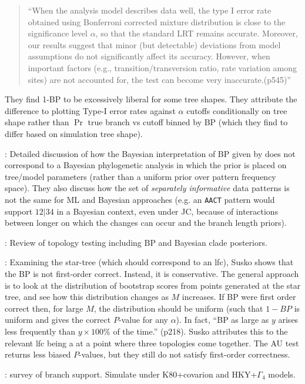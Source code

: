 \documentclass[11pt]{article}
\newcommand{\pvalue}{$P$-value\xspace}
\newcommand{\pvalues}{$P$-values\xspace}
\begin{document}
\begin{quote}
	``When the analysis model describes data well, the type I error rate obtained using Bonferroni corrected mixture distribution is close to the significance level $\alpha$, so that the standard LRT remains accurate. Moreover, our results suggest that minor (but detectable) deviations from model assumptions do not significantly affect its accuracy. However, when important factors (e.g., transition/transversion ratio, rate variation among sites) are not accounted for, the test can become very inaccurate.(p545)''
\end{quote}

They find 1-BP to be excessively liberal for some tree shapes. They attribute the difference to plotting Type-I error rates against $\alpha$ cutoffs conditionally on tree shape rather than $\Pr$ true branch vs cutoff binned by BP (which they find to differ based on simulation tree shape).

\citet{SvennbladdEOB2006}: Detailed discussion of how the Bayesian interpretation of BP given by \citet{EfronHH1996} does not correspond to a Bayesian phylogenetic analysis in which the prior is placed on tree/model parameters (rather than a uniform prior over pattern frequency space).
They also discuss how the set of {\em separately informative} data patterns is not the same for ML and Bayesian approaches (e.g. an {\tt{AACT}} pattern would support $12|34$ in a Bayesian context, even under JC, because of interactions between longer on which the changes can occur and the branch length priors). 

\citet{Wrobel2008}: Review of topology testing including BP and Bayesian clade posteriors.


\citet{Susko2009}: Examining the star-tree (which should correspond to an lfc), Susko shows that \citep[{\em contra}\xspace][]{EfronHH1996} the BP is not first-order correct.
Instead, it is conservative. 
The general approach is to look at the distribution of bootstrap scores from points generated at the star tree, and see how this distribution changes as $M$ increases.
If BP were first order correct then, for large $M$, the distribution should be uniform (such that $1-BP$ is uniform and gives the correct \pvalue for any $\alpha$). 
In fact, ``BP as large as $y$ arises less frequently than $y\times 100\%$ of the time.'' (p218).
Susko attributes this to the relevant lfc being a at a point where three topologies come together. 
The AU test returns less biased \pvalues, but they still do not satisfy first-order correctness.

\citet{AnisimovaGDDG2011}: survey of branch support. Simulate under K80+covarion and HKY+$\Gamma_4$ models.


 
\end{document}
